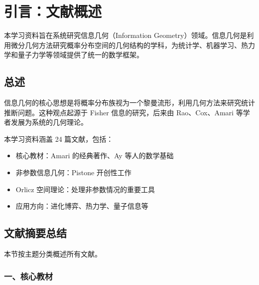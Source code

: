 \chapter*{引言：文献概述}\label{chap:introduction}

本学习资料旨在系统研究信息几何（Information Geometry）领域。信息几何是利用微分几何方法研究概率分布空间的几何结构的学科，为统计学、机器学习、热力学和量子力学等领域提供了统一的数学框架。

\section{总述}

信息几何的核心思想是将概率分布族视为一个黎曼流形，利用几何方法来研究统计推断问题。这种观点起源于 Fisher 信息的研究，后来由 Rao、Cox、Amari 等学者发展为系统的几何理论。

本学习资料涵盖 24 篇文献，包括：
\begin{itemize}
    \item 核心教材：Amari 的经典著作、Ay 等人的数学基础
    \item 非参数信息几何：Pistone 开创性工作
    \item Orlicz 空间理论：处理非参数情况的重要工具
    \item 应用方向：进化博弈、热力学、量子信息等
\end{itemize}

\section{文献摘要总结}\label{sec:literature-summary}

本节按主题分类概述所有文献。

\subsection{一、核心教材}

